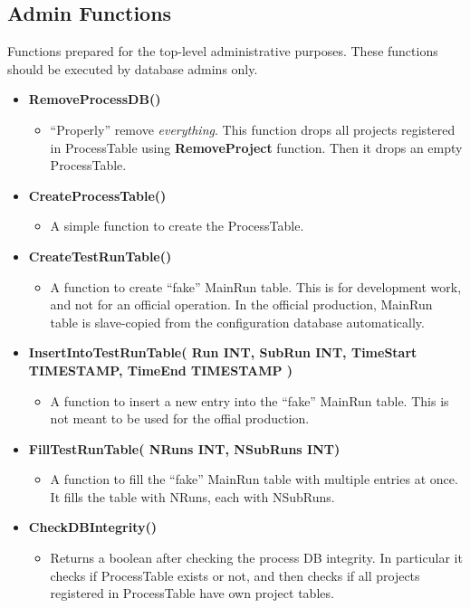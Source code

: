 \subsection{Admin Functions}
Functions prepared for the top-level administrative purposes. These functions
should be executed by database admins only.
\begin{itemize}
  \item {\bf RemoveProcessDB()}
    \begin{itemize}
      \item ``Properly'' remove {\it everything}. This function drops all
        projects registered in ProcessTable using {\bf RemoveProject} 
        function. Then it drops an empty ProcessTable.
    \end{itemize}
  \item {\bf CreateProcessTable()}
    \begin{itemize}
      \item A simple function to create the ProcessTable.
    \end{itemize}
  \item {\bf CreateTestRunTable()}
    \begin{itemize}
      \item A function to create ``fake'' MainRun table. This is for 
        development work, and not for an official operation. In the official
        production, MainRun table is slave-copied from the configuration
        database automatically.
    \end{itemize}
  \item {\bf InsertIntoTestRunTable( Run INT, SubRun INT, TimeStart TIMESTAMP, TimeEnd TIMESTAMP )}
    \begin{itemize}
      \item A function to insert a new entry into the ``fake'' MainRun table.
        This is not meant to be used for the offial production.
    \end{itemize}
  \item {\bf FillTestRunTable( NRuns INT, NSubRuns INT)}
    \begin{itemize}
      \item A function to fill the ``fake'' MainRun table with multiple entries
        at once. It fills the table with NRuns, each with NSubRuns.
    \end{itemize}
  \item {\bf CheckDBIntegrity()}
    \begin{itemize}
      \item Returns a boolean after checking the process DB integrity. 
        In particular it checks if ProcessTable exists or not, and then
        checks if all projects registered in ProcessTable have own project
        tables.
    \end{itemize}
\end{itemize}



